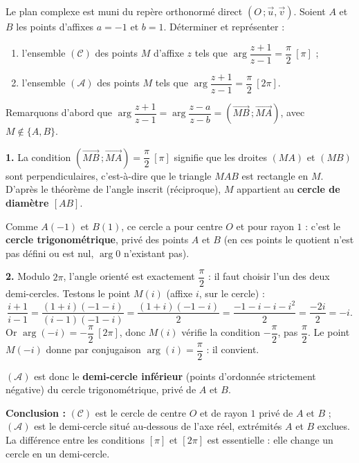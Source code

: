 \documentclass[11pt]{article}
\begin{document}
\begin{exoresolu}
Le plan complexe est muni du repère orthonormé direct $(O\,;\vec u,\vec v)$. Soient $A$ et $B$ les points d'affixes $a=-1$ et $b=1$. Déterminer et représenter :
\begin{enumerate}
\item l'ensemble $(\mathcal{C})$ des points $M$ d'affixe $z$ tels que $\arg\dfrac{z+1}{z-1}=\dfrac{\pi}{2}\ [\pi]$ ;
\item l'ensemble $(\mathcal{A})$ des points $M$ tels que $\arg\dfrac{z+1}{z-1}=\dfrac{\pi}{2}\ [2\pi]$.
\end{enumerate}
\tcblower
Remarquons d'abord que $\arg\dfrac{z+1}{z-1}=\arg\dfrac{z-a}{z-b}=\left(\overrightarrow{MB}\,;\overrightarrow{MA}\right)$, avec $M\notin\{A,B\}$.

\textbf{1.} La condition $\left(\overrightarrow{MB}\,;\overrightarrow{MA}\right)=\dfrac{\pi}{2}\ [\pi]$ signifie que les droites $(MA)$ et $(MB)$ sont perpendiculaires, c'est-à-dire que le triangle $MAB$ est rectangle en $M$. D'après le théorème de l'angle inscrit (réciproque), $M$ appartient au \textbf{cercle de diamètre $[AB]$}.

Comme $A(-1)$ et $B(1)$, ce cercle a pour centre $O$ et pour rayon $1$ : c'est le \textbf{cercle trigonométrique}, privé des points $A$ et $B$ (en ces points le quotient n'est pas défini ou est nul, $\arg 0$ n'existant pas).

\textbf{2.} Modulo $2\pi$, l'angle orienté est exactement $\dfrac{\pi}{2}$ : il faut choisir l'un des deux demi-cercles. Testons le point $M(i)$ (affixe $i$, sur le cercle) :
\[ \frac{i+1}{i-1}=\frac{(1+i)(-1-i)}{(i-1)(-1-i)}=\frac{(1+i)(-1-i)}{2}=\frac{-1-i-i-i^2}{2}=\frac{-2i}{2}=-i. \]
Or $\arg(-i)=-\dfrac{\pi}{2}\ [2\pi]$, donc $M(i)$ vérifie la condition $-\dfrac{\pi}{2}$, pas $\dfrac{\pi}{2}$. Le point $M(-i)$ donne par conjugaison $\arg(i)=\dfrac{\pi}{2}$ : il convient.

$(\mathcal{A})$ est donc le \textbf{demi-cercle inférieur} (points d'ordonnée strictement négative) du cercle trigonométrique, privé de $A$ et $B$.

\textbf{Conclusion :} $(\mathcal{C})$ est le cercle de centre $O$ et de rayon $1$ privé de $A$ et $B$ ; $(\mathcal{A})$ est le demi-cercle situé au-dessous de l'axe réel, extrémités $A$ et $B$ exclues. La différence entre les conditions $[\pi]$ et $[2\pi]$ est essentielle : elle change un cercle en un demi-cercle.
\end{exoresolu}
\end{document}
